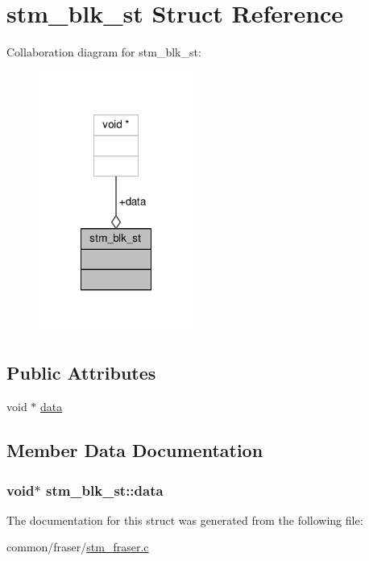 \hypertarget{structstm__blk__st}{\section{stm\-\_\-blk\-\_\-st Struct Reference}
\label{structstm__blk__st}
}


Collaboration diagram for stm\-\_\-blk\-\_\-st\-:
\nopagebreak
\begin{figure}[H]
\begin{center}
\leavevmode
\includegraphics[width=144pt]{structstm__blk__st__coll__graph}
\end{center}
\end{figure}
\subsection*{Public Attributes}
\begin{DoxyCompactItemize}
\item 
void $\ast$ \hyperlink{structstm__blk__st_ac18f9b332302a62b1a335f539a65b10f}{data}
\end{DoxyCompactItemize}


\subsection{Member Data Documentation}
\hypertarget{structstm__blk__st_ac18f9b332302a62b1a335f539a65b10f}{
\subsubsection[{data}]{\setlength{\rightskip}{0pt plus 5cm}void$\ast$ stm\-\_\-blk\-\_\-st\-::data}}\label{structstm__blk__st_ac18f9b332302a62b1a335f539a65b10f}


The documentation for this struct was generated from the following file\-:\begin{DoxyCompactItemize}
\item 
common/fraser/\hyperlink{stm__fraser_8c}{stm\-\_\-fraser.\-c}\end{DoxyCompactItemize}
